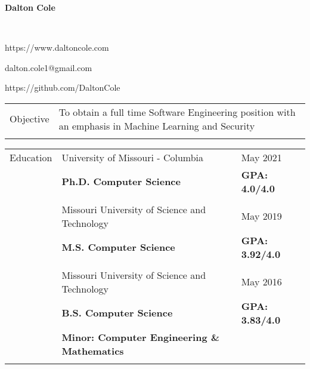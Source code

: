 \documentclass[10.5pt, arial]{article}
\newcommand\textbox[1]{%
  \parbox{.333\textwidth}{#1}%
}
\begin{document}
\noindent   \textbox{\hfill}                                \textbox{\hfil \textbf{Dalton Cole}    \hfil} \textbox{\hfill} \\
\noindent   \textbox{https://www.daltoncole.com \hfill}     \textbox{\hfil dalton.cole1@gmail.com  \hfil} \textbox{\hfill https://github.com/DaltonCole}

\noindent\makebox[\linewidth]{\rule{\textwidth}{.4pt}} 

    \begin{tabular}{p{1.5cm} l}
Objective  	& To obtain a full time Software Engineering position with an emphasis in Machine Learning and Security   \\ \\
\end{tabular}

\begin{tabular}{p{1.5cm} p{13.2cm} l}
Education  	& University of Missouri - Columbia				 					& May 2021 				\\
			& \textbf{Ph.D. Computer Science} 									& \textbf{GPA: 4.0/4.0}	\\ \\

			& Missouri University of Science and Technology 					& May 2019 				\\
			& \textbf{M.S. Computer Science}									& \textbf{GPA: 3.92/4.0}	\\ \\

		  	& Missouri University of Science and Technology 					& May 2016 				\\
			& \textbf{B.S. Computer Science} 									& \textbf{GPA: 3.83/4.0} \\
			& \textbf{Minor: Computer Engineering \& Mathematics} 										\\ \\
\end{tabular}
\end{document}
